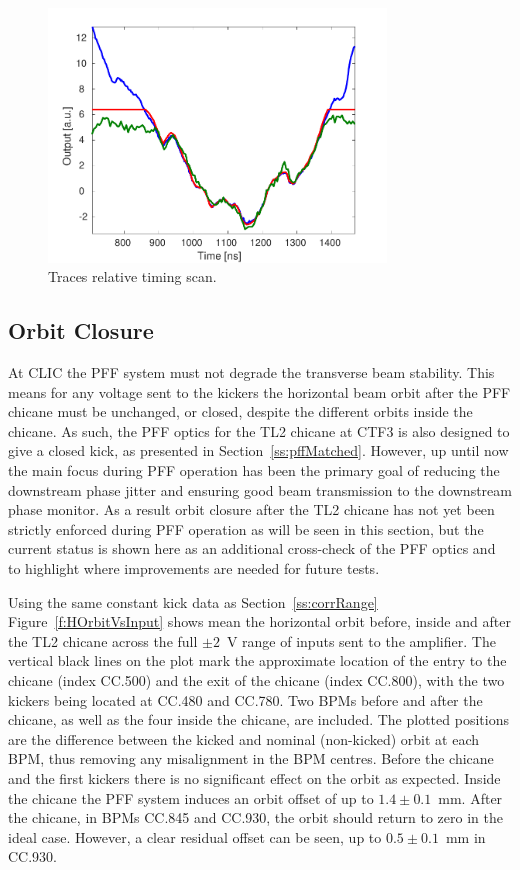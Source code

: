 \begin{figure}
  \centering
  \includegraphics[width=0.8\textwidth]{Figures/commissioning/pffKickShape}
  \caption{Traces relative timing scan.}
  \label{f:pffKickShape}
\end{figure}

\subsection{Orbit Closure}
\label{ss:orbitClosure}

At CLIC the PFF system must not degrade the transverse beam stability. This means for any voltage sent to the kickers the horizontal beam orbit after the PFF chicane must be unchanged, or closed, despite the different orbits inside the chicane. As such, the PFF optics for the TL2 chicane at CTF3 is also designed to give a closed kick, as presented in Section~\ref{ss:pffMatched}. However, up until now the main focus during PFF operation has been the primary goal of reducing the downstream phase jitter and ensuring good beam transmission to the downstream phase monitor. As a result orbit closure after the TL2 chicane has not yet been strictly enforced during PFF operation as will be seen in this section, but the current status is shown here as an additional cross-check of the PFF optics and to highlight where improvements are needed for future tests.

Using the same constant kick data as Section~\ref{ss:corrRange} Figure~\ref{f:HOrbitVsInput} shows mean the horizontal orbit before, inside and after the TL2 chicane across the full \(\pm2\)~V range of inputs sent to the amplifier. The vertical black lines on the plot mark the approximate location of the entry to the chicane (index CC.500) and the exit of the chicane (index CC.800), with the two kickers being located at CC.480 and CC.780. Two BPMs before and after the chicane, as well as the four inside the chicane, are included. The plotted positions are the difference between the kicked and nominal (non-kicked) orbit at each BPM, thus removing any misalignment in the BPM centres. Before the chicane and the first kickers there is no significant effect on the orbit as expected. Inside the chicane the PFF system induces an orbit offset of up to \(1.4\pm0.1\)~mm. After the chicane, in BPMs CC.845 and CC.930, the orbit should return to zero in the ideal case. However, a clear residual offset can be seen, up to \(0.5\pm0.1\)~mm in CC.930.

